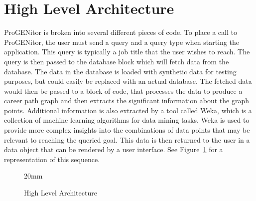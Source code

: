 \section{High Level Architecture}
\label{sect:high-level-architecture}
ProGENitor is broken into several different pieces of code.  To place a call
to ProGENitor, the user must send a query and a query type when starting the
application.  This query is typically a job title that the user wishes to reach.
The query is then passed to the database block which will fetch data from the
database.  The data in the database is loaded with synthetic data for testing
purposes, but could easily be replaced with an actual database. The fetched data
would then be passed to a block of code, that processes the data to produce a
career path graph and then extracts the significant information about the graph
points.  Additional information is also extracted by a tool called Weka, which
is a collection of machine learning algorithms for data mining tasks.  Weka is
used to provide more complex insights into the combinations of data points that
may be relevant to reaching the queried goal.  This data is then returned to the
user in a data object that can be rendered by a user interface.  See
Figure~\ref{fig:HighLevelProjectArchitecture} for a representation of this sequence.

\usetikzlibrary{shapes,arrows,chains}

\begin{figure}[H]
	\centering
  	\resizebox {!} {20mm} {
}

	\caption{High Level Architecture}
	\label{fig:HighLevelProjectArchitecture}
\end{figure}


